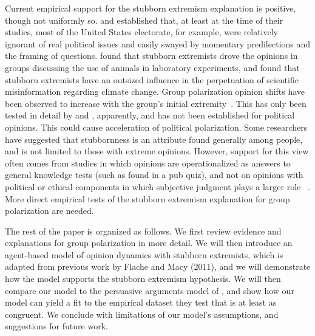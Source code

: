 Current empirical support for the stubborn extremism explanation is positive, though not uniformly so.
 and  established that, at least at the time of their studies, most of the United States electorate, for example, were relatively ignorant of real political issues
and easily swayed by momentary predilections and the framing of questions.  found that stubborn extremists drove the opinions in groups discussing the use of animals in laboratory experiments, and 
 found that stubborn extremists have an
outsized influence in the perpetuation of scientific misinformation 
regarding climate change. 
Group polarization opinion shifts have been observed to increase with the group's initial 
extremity~\cite{Teger1967,Myers1972,Myers1982,Brown1986}. This has only been
tested in detail by  and , apparently, and
has not been established for political opinions. This 
could cause acceleration of political polarization.  
Some researchers have suggested that stubbornness is an attribute found generally among people, and is not limited to those with extreme opinions. However, support for this view often comes from studies in which opinions are operationalized as answers to general knowledge tests (such as found in a pub quiz), and not on opinions with political or ethical components in which subjective judgment plays a larger role~ \cite{Moussaid2013,Chacoma2015}. More direct empirical tests of the stubborn extremism explanation for group polarization are needed. 

The rest of the paper is organized as follows. We first review evidence and explanations
for group polarization in more detail. We will then introduce an agent-based model of opinion dynamics with stubborn extremists, which is adapted from previous work by Flache and Macy (2011), and we will demonstrate how the model supports the stubborn extremism hypothesis. We will then compare our model to the persuasive arguments model of , and show how our model can yield a fit to the empirical dataset they test that is at least as congruent. We conclude with limitations of our model's assumptions, and suggestions for future work. 


